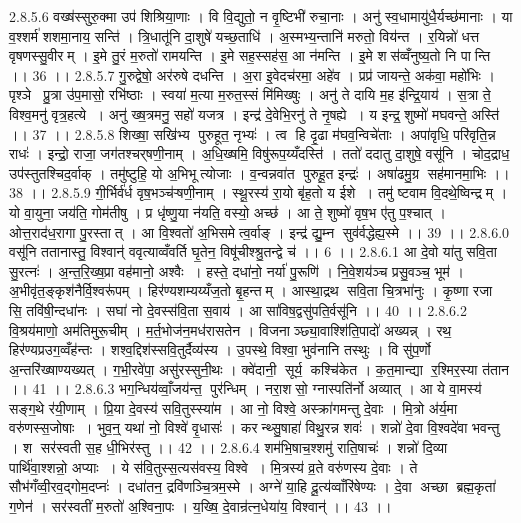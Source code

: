 2.8.5.6
वख्ष॑स्सुरु॒क्मा उप॑ शिश्रिया॒णाः । वि वि॒द्युतो॒ न वृ॒ष्टिभी॑ रुचा॒नाः । अनु॑ स्व॒धामायु॑धै॒र्यच्छ॑मानाः । या व॒श्शर्म॑ शशमा॒नाय॒ सन्ति॑ । त्रि॒धातू॑नि दा॒शुषे॑ यच्छ॒ताधि॑ । अ॒स्मभ्य॒न्तानि॑ मरुतो॒ विय॑न्त । र॒यिन्नो॑ धत्त वृषणस्सु॒वीरम् । इ॒मे तु॒रं म॒रुतो॑ रामयन्ति । इ॒मे सह॒स्सह॑स॒ आ न॑मन्ति । इ॒मे शस॑व्वँनुष्य॒तो नि पान्ति ।। 36 ।।
2.8.5.7
गु॒रुद्वेषो॒ अर॑रुषे दधन्ति । अ॒रा इ॒वेदच॑रमा॒ अहे॑व । प्रप्र॑ जायन्ते॒ अक॑वा॒ महो॑भिः । पृश्ञे प्रु॒त्रा उ॑प॒मासो॒ रभि॑ष्ठाः । स्वया॑ म॒त्या म॒रुत॒स्सं मि॑मिख्षुः । अनु॑ ते दायि म॒ह इ॑न्द्रि॒याय॑ । स॒त्रा ते॒ विश्व॒मनु॑ वृत्र॒हत्ये । अनु॑ ख्ष॒त्रमनु॒ सहो॑ यजत्र । इन्द्र॑ दे॒वेभि॒रनु॑ ते नृ॒षह्ये । य इन्द्र॒ शुष्मो॑ मघवन्ते॒ अस्ति॑ ।। 37 ।।
2.8.5.8
शिख्षा॒ सखि॑भ्य पुरुहूत॒ नृभ्यः॑ । त्व हि दृ॒ढा म॑घव॒न्विचे॑ताः । अपा॑वृधि॒ परि॑वृति॒न्न राधः॑ । इन्द्रो॒ राजा॒ जग॑तश्चर्‌षणी॒नाम् । अ॒धि॒ख्षमि॒ विषु॑रूप॒य्यँदस्ति॑ । ततो॑ ददातु दा॒शुषे॒ वसू॑नि । चोद॒द्राध॒ उप॑स्तुतश्चिद॒र्वाक् । तमु॑ष्टुहि॒ यो अ॒भिभूत्योजाः । व॒न्वन्नवा॑त पुरुहू॒त इन्द्रः॑ । अषा॑ढमु॒ग्र सह॑मानमा॒भिः ।। 38 ।।
2.8.5.9
गी॒र्भिर्व॑र्ध वृष॒भञ्च॑ऱ्षणी॒नाम् । स्थू॒रस्य॑ रा॒यो बृ॑ह॒तो य ईशे । तमु॑ ष्टवाम वि॒दथे॒ष्विन्द्रम् । यो वा॒युना॒ जय॑ति॒ गोम॑तीषु । प्र धृ॑ष्णु॒या न॑यति॒ वस्यो॒ अच्छ॑ । आ ते॒ शुष्मो॑ वृष॒भ ए॑तु प॒श्चात् । ओत्त॒राद॑ध॒रागा पु॒रस्तात् । आ वि॒श्वतो॑ अ॒भिसमेत्व॒र्वाङ् । इन्द्र॑ द्यु॒म्न सुव॑र्वद्धेह्य॒स्मे ।। 39 ।।
2.8.6.0
वसू॑नि ततानास्तु॒ विश्वान्॑ ववृत्याव्वँवर्ति घृ॒तेन॒ विषू॑चीश्श्रु॒तन्द्वे च॑ ।। 6 ।।
2.8.6.1
आ दे॒वो या॑तु सवि॒ता सु॒रत्नः॑ । अ॒न्त॒रि॒ख्ष॒प्रा वह॑मानो॒ अश्वैः । हस्ते॒ दधा॑नो॒ नर्या॑ पु॒रूणि॑ । नि॒वे॒शय॑ञ्च प्रसु॒वञ्च॒ भूम॑ । अ॒भीवृ॑त॒ङ्कृश॑नैर्वि॒श्वरू॑पम् । हिर॑ण्यशम्यय्यँज॒तो बृ॒हन्तम् । आस्था॒द्रथ॑ सवि॒ता चि॒त्रभा॑नुः । कृ॒ष्णा रजा॑ सि॒ तवि॑षी॒न्दधा॑नः । सघा॑ नो दे॒वस्स॑वि॒ता स॒वाय॑ । आ सा॑विष॒द्वसु॑पति॒र्वसू॑नि ।। 40 ।।
2.8.6.2
वि॒श्रय॑माणो॒ अम॑तिमुरू॒चीम् । म॒र्त॒भोज॑न॒मध॑रासतेन । विजनाञ्छ्या॒वाश्शि॑ति॒पादो॑ अख्यन्न् । रथ॒॒ हिर॑ण्यप्रउग॒व्वँह॑न्तः । शश्व॒द्दिश॑स्सवि॒तुर्दैव्य॑स्य । उ॒पस्थे॒ विश्वा॒ भुव॑नानि तस्थुः । वि सु॑प॒र्णो अ॒न्तरि॑ख्षाण्यख्यत् । ग॒भी॒रवे॑पा॒ असु॑रस्सुनी॒थः । क्वे॑दानी॒॒ सूर्य॒ कश्चि॑केत । क॒त॒मान्द्या र॒श्मिर॒स्या त॑तान ।। 41 ।।
2.8.6.3
भग॒न्धिय॑व्वाँ॒जय॑न्त॒ पुर॑न्धिम् । नरा॒शसो॒ ग्नास्पति॑र्नो अव्यात् । आ ये वा॒मस्य॑ सङ्ग॒थे र॑यी॒णाम् । प्रि॒या दे॒वस्य॑ सवि॒तुस्स्या॑म । आ नो॒ विश्वे॒ अस्क्रा॑गमन्तु दे॒वाः । मि॒त्रो अ॑र्य॒मा वरु॑णस्स॒जोषाः । भुव॒न्॒ यथा॑ नो॒ विश्वे॑ वृ॒धासः॑ । करन्थ्सु॒षाहा॑ विथु॒रन्न शवः॑ । शन्नो॑ दे॒वा वि॒श्वदे॑वा भवन्तु । श सर॑स्वती स॒ह धी॒भिर॑स्तु ।। 42 ।।
2.8.6.4
शम॑भि॒षाच॒श्शमु॑ राति॒षाचः॑ । शन्नो॑ दि॒व्या पार्थि॑वा॒श्शन्नो॒ अप्याः । ये स॑वि॒तुस्स॒त्यस॑वस्य॒ विश्वे । मि॒त्रस्य॑ व्र॒ते वरु॑णस्य दे॒वाः । ते सौभ॑गँव्वी॒रव॒द्गोम॒दप्नः॑ । दधा॑तन॒ द्रवि॑णञ्चि॒त्रम॒स्मे । अग्ने॑ या॒हि दू॒त्य॑व्वाँरि॑षेण्यः । दे॒वा अच्छा ब्रह्म॒कृता॑ ग॒णेन॑ । सर॑स्वतीं म॒रुतो॑ अ॒श्विना॒पः । य॒ख्षि॒ दे॒वान्र॑त्न॒धेया॑य॒ विश्वान्॑ ।। 43 ।।
